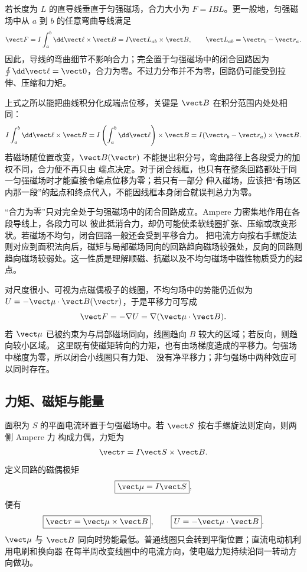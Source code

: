 \ampereForceDiagram

若长度为 $L$ 的直导线垂直于匀强磁场，合力大小为 $F=IBL$。更一般地，匀强磁场中从 $a$ 到
$b$ 的任意弯曲导线满足
\begin{equation}
  \vect F=I\int_a^b\dd\vect\ell\times\vect B
  =I\vect L_{ab}\times\vect B,
  \qquad \vect L_{ab}=\vect r_b-\vect r_a.
\end{equation}
因此，导线的弯曲细节不影响合力；完全置于匀强磁场中的闭合回路因为
$\oint\dd\vect\ell=\vect 0$，合力为零。不过力分布并不为零，回路仍可能受到拉伸、压缩和力矩。

上式之所以能把曲线积分化成端点位移，关键是 $\vect B$ 在积分范围内处处相同：
\begin{equation}
 I\int_a^b\dd\vect\ell\times\vect B
 =I\left(\int_a^b\dd\vect\ell\right)\times\vect B
 =I(\vect r_b-\vect r_a)\times\vect B.
\end{equation}
若磁场随位置改变，$\vect B(\vect r)$ 不能提出积分号，弯曲路径上各段受力的加权不同，合力便不再只由
端点决定。对于闭合线框，也只有在整条回路都处于同一匀强磁场时才能直接令端点位移为零；若只有一部分
伸入磁场，应该把“有场区内那一段”的起点和终点代入，不能因线框本身闭合就误判总力为零。

“合力为零”只对完全处于匀强磁场中的闭合回路成立。Ampere 力密集地作用在各段导线上，各段力可以
彼此抵消合力，却仍可能使柔软线圈扩张、压缩或改变形状。若磁场不均匀，闭合回路一般还会受到平移合力。
把电流方向按右手螺旋法则对应到面积法向后，磁矩与局部磁场同向的回路趋向磁场较强处，反向的回路则
趋向磁场较弱处。这一性质是理解顺磁、抗磁以及不均匀磁场中磁性物质受力的起点。

对尺度很小、可视为点磁偶极子的线圈，不均匀场中的势能仍近似为
$U=-\vect\mu\cdot\vect B(\vect r)$，于是平移力可写成
\begin{equation}
  \vect F=-\nabla U=\nabla(\vect\mu\cdot\vect B).
\end{equation}
若 $\vect\mu$ 已被约束为与局部磁场同向，线圈趋向 $B$ 较大的区域；若反向，则趋向较小区域。
这里既有使磁矩转向的力矩，也有由场梯度造成的平移力。匀强场中梯度为零，所以闭合小线圈只有力矩、
没有净平移力；非匀强场中两种效应可以同时存在。

\bentWireResultDiagram

\subsection*{力矩、磁矩与能量}

面积为 $S$ 的平面电流环置于匀强磁场中。若 $\vect S$ 按右手螺旋法则定向，则两侧 Ampere 力
构成力偶，力矩为
\begin{equation}
  \vect\tau=I\vect S\times\vect B.
\end{equation}
定义回路的磁偶极矩
\begin{equation}
  \boxed{\vect\mu=I\vect S},
\end{equation}
便有
\begin{equation}
  \boxed{\vect\tau=\vect\mu\times\vect B},
  \qquad
  \boxed{U=-\vect\mu\cdot\vect B}.
\end{equation}
$\vect\mu$ 与 $\vect B$ 同向时势能最低。普通线圈只会转到平衡位置；直流电动机利用电刷和换向器
在每半周改变线圈中的电流方向，使电磁力矩持续沿同一转动方向做功。

